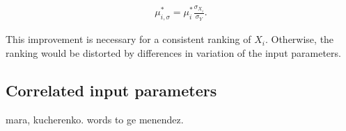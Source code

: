 \documentclass[a4paper,12pt]{article}
\begin{document}
\begin{align}
\mu_{i,\sigma}^* = \mu_i^* \frac{\sigma_{X_i}}{\sigma_Y}.
\end{align}

\noindent
This improvement is necessary for a consistent ranking of $X_i$. Otherwise, the ranking would be distorted by differences in variation of the input parameters. 

\subsection{Correlated input parameters}

mara, kucherenko.
words to ge menendez.

\newpage

\end{document}
